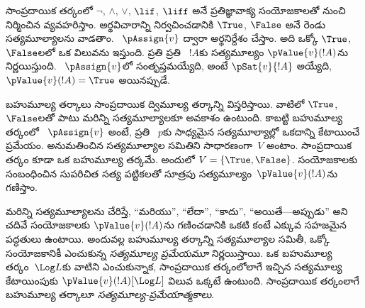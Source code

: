 \documentclass[../../../include/open-logic-section]{subfiles}
\begin{document}


సాంప్రదాయిక తర్కంలో $\lnot$, $\land$, $\lor$, $\lif$,
$\liff$ అనే ప్రతిజ్ఞావాక్య సంయోజకాలతో
నుంచి నిర్మించిన 
వ్యవహరిస్తాం. అర్థవిచారాన్ని నిర్వచించడానికి $\True$, $\False$
అనే రెండు సత్యమూల్యాలను వాడతాం.
~$\pAssign{v}$ ద్వారా
అర్థనిర్దేశం చేస్తాం. అది ఒక్కో 
$\True$, $\False$లలో ఒక విలువను ఇస్తుంది. ప్రతి
 ప్రతి
~$!A$కు సత్యమూల్యం
$\pValue{v}(!A)$ను నిర్ణయిస్తుంది. 
~$\pAssign{v}$లో
సంతృప్తమయ్యేది, అంటే $\pSat{v}{!A}$ అయ్యేది,
$\pValue{v}(!A) = \True$ అయినప్పుడే.

బహుమూల్య తర్కాలు సాంప్రదాయిక ద్విమూల్య తర్కాన్ని
విస్తరిస్తాయి. వాటిలో $\True$, $\False$లతో పాటు మరిన్ని
సత్యమూల్యాలకూ అవకాశం ఉంటుంది.
కాబట్టి బహుమూల్య తర్కంలో ~$\pAssign{v}$
అంటే, ప్రతి ~$p$కు
సాధ్యమైన సత్యమూల్యాల్లో ఒకదాన్ని కేటాయించే
ప్రమేయం. అనుమతించిన సత్యమూల్యాల సమితిని సాధారణంగా~$V$
అంటాం. సాంప్రదాయిక తర్కం కూడా ఒక బహుమూల్య తర్కమే. అందులో
$V = \{\True, \False\}$. సంయోజకాలకు సంబంధించిన సుపరిచిత సత్య పట్టికలతో సూత్రపు
సత్యమూల్యం~$\pValue{v}(!A)$ను గణిస్తాం.

మరిన్ని సత్యమూల్యాలను చేరిస్తే, “మరియు”, “లేదా”,
“కాదు”, “అయితే---అప్పుడు” అని చదివే సంయోజకాలకు
$\pValue{v}(!A)$ను గణించడానికి ఒకటి కంటే ఎక్కువ
సహజమైన పద్ధతులు ఉంటాయి. అందువల్ల బహుమూల్య తర్కాన్ని
సత్యమూల్యాల సమితీ, ఒక్కో సంయోజకానికీ ఎంచుకున్న
\emph{సత్యమూల్య ప్రమేయమూ} నిర్ణయిస్తాయి. ఒక బహుమూల్య
తర్కం~$\Log L$కు వాటిని ఎంచుకున్నాక, సాంప్రదాయిక
తర్కంలోలాగే ఇచ్చిన సత్యమూల్య కేటాయింపుకు
$\pValue{v}(!A)[\Log L]$ విలువ ఒక్కటే ఉంటుంది. సాంప్రదాయిక
తర్కంలాగే బహుమూల్య తర్కాలూ \emph{సత్యమూల్య-ప్రమేయాత్మకాలు}.
\end{document}
